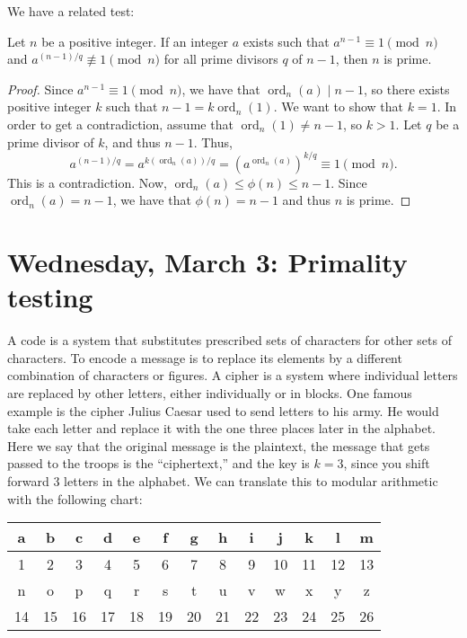 \documentclass[letterpaper, 11 pt]{article}
\newcommand{\ord}{\operatorname{ord}}
\begin{document}
We have a related test:
\begin{thm}
 Let $n$ be a positive integer. If an integer $a$ exists such that $a^{n-1} \equiv 1 \pmod n$ and $a^{(n-1)/q}\not\equiv 1\pmod n$ for all prime divisors $q$ of $n-1$, then $n$ is prime.
\end{thm}
\begin{proof}
 Since $a^{n-1} \equiv 1 \pmod n$, we have that $\ord_n(a)\mid n-1$, so there exists positive integer $k$ such that $n-1=k \ord_n(1)$. We want to show that $k=1$. In order to get a contradiction, assume that $\ord_n(1)\neq n-1$, so $k>1$. Let $q$ be a prime divisor of $k$, and thus $n-1$. Thus,  \[a^{(n-1)/q}=a^{k(\ord_n(a))/q}=(a^{\ord_n(a)})^{k/q}\equiv 1 \pmod n.\] This is a contradiction. Now, $\ord_n(a)\leq \phi(n)\leq n-1$. Since $ \ord_n(a)=n-1$, we have that $\phi(n)=n-1$ and thus $n$ is prime.
\end{proof}
\section{Wednesday, March 3: Primality testing}
A code is a system that substitutes prescribed sets of characters for other sets of characters. To encode a message is to replace its elements by a different combination of characters or figures. A cipher is a system where individual letters are replaced by other letters, either individually or in blocks.
One famous example is the cipher Julius Caesar used to send letters to his army. He would take each letter and replace it with the one three places later in the alphabet. Here we say that the original message is the plaintext, the message that gets passed to the troops is the “ciphertext,” and the key is $k=3$, since you shift forward 3 letters in the alphabet. We can translate this to modular arithmetic with the following chart:
\begin{center}
\begin{tabular}{|c|c|c|c|c|c|c|c|c|c|c|c|c|}\hline
 a&b&c&d&e&f&g&h&i&j&k&l&m\\\hline
 1&2&3&4&5&6&7&8&9&10&11&12&13\\\hline\hline
 n&o&p&q&r&s&t&u&v&w&x&y&z\\\hline
 14&15&16&17&18&19&20&21&22&23&24&25&26\\\hline\hline
\end{tabular}
\end{center}
\end{document}
